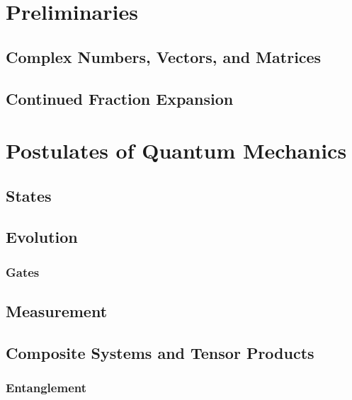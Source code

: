 \chapter{Preliminaries} %

    \section{Complex Numbers, Vectors, and Matrices} %

    \section{Continued Fraction Expansion} %

\chapter{Postulates of Quantum Mechanics} %

    \section{States} %

    \section{Evolution} %

        \subsection{Gates} %

    \section{Measurement} %

    \section{Composite Systems and Tensor Products} %

        \subsection{Entanglement} %

